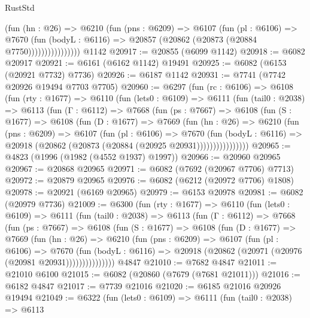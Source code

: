 \begin{lexlean}{RustStd}
\begin{coremodule}
                      (fun (hn : @26) =>
                      @6210
                        (fun (pns : @6209) =>
                        @6107
                          (fun (pl : @6106) =>
                          @7670
                            (fun (bodyL : @6116) =>
                            @20857 (@20862 (@20873 (@20884 @7750))))))))))))))))
    @1142
@20917 := @20855 (@6099 @1142)
@20918 := @6082 @20917
@20921 := @6161 (@6162 @1142) @19491
@20925 := @6082 (@6153 (@20921 @7732) @7736)
@20926 := @6187 @1142
@20931 := @7741 (@7742 @20926 @19494 @7703 @7705)
@20960 := @6297
    (fun (rc : @6106) =>
    @6108
      (fun (rty : @1677) =>
      @6110
        (fun (lets0 : @6109) =>
        @6111
          (fun (tail0 : @2038) =>
          @6113
            (fun (Γ : @6112) =>
            @7668
              (fun (ps : @7667) =>
              @6108
                (fun (S : @1677) =>
                @6108
                  (fun (D : @1677) =>
                  @7669
                    (fun (hn : @26) =>
                    @6210
                      (fun (pns : @6209) =>
                      @6107
                        (fun (pl : @6106) =>
                        @7670
                          (fun (bodyL : @6116) =>
                          @20918 (@20862 (@20873 (@20884 (@20925 @20931))))))))))))))))
@20965 := @4823 (@1996 (@1982 (@4552 @1937) @1997))
@20966 := @20960 @20965
@20967 := @20868 @20965
@20971 := @6082 (@7692 (@20967 @7706) @7713)
@20972 := @20879 @20965
@20976 := @6082 (@6212 (@20972 @7706) @1808)
@20978 := @20921 (@6169 @20965)
@20979 := @6153 @20978
@20981 := @6082 (@20979 @7736)
@21009 := @6300
    (fun (rty : @1677) =>
    @6110
      (fun (lets0 : @6109) =>
      @6111
        (fun (tail0 : @2038) =>
        @6113
          (fun (Γ : @6112) =>
          @7668
            (fun (ps : @7667) =>
            @6108
              (fun (S : @1677) =>
              @6108
                (fun (D : @1677) =>
                @7669
                  (fun (hn : @26) =>
                  @6210
                    (fun (pns : @6209) =>
                    @6107
                      (fun (pl : @6106) =>
                      @7670
                        (fun (bodyL : @6116) =>
                        @20918 (@20862 (@20971 (@20976 (@20981 @20931)))))))))))))))
    @4847
@21010 := @7682 @4847
@21011 := @21010 @6100
@21015 := @6082 (@20860 (@7679 (@7681 @21011)))
@21016 := @6182 @4847
@21017 := @7739 @21016
@21020 := @6185 @21016 @20926 @19494
@21049 := @6322
    (fun (lets0 : @6109) =>
    @6111
      (fun (tail0 : @2038) =>
      @6113

\end{coremodule}
\end{lexlean}
